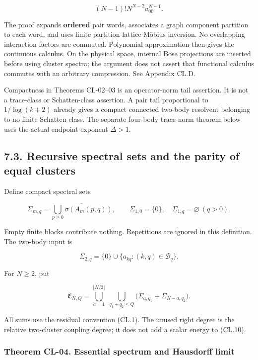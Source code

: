 \documentclass[a4paper,11pt]{article}
\numberwithin{equation}{section}
\begin{document}
\[
(N-1)!N^{N-2}a_{00}^{N-1}.
\tag{CL.8}
\]

The proof expands \textbf{ordered} pair words, associates a graph component partition to each word, and uses finite partition-lattice Möbius inversion. No overlapping interaction factors are commuted. Polynomial approximation then gives the continuous calculus. On the physical space, internal Bose projections are inserted before using cluster spectra; the argument does not assert that functional calculus commutes with an arbitrary compression. See Appendix CL.D.

Compactness in Theorems CL-02--03 is an operator-norm tail assertion. It is not a trace-class or Schatten-class assertion. A pair tail proportional to \(1/\log(k+2)\) already gives a compact connected two-body resolvent belonging to no finite Schatten class. The separate four-body trace-norm theorem below uses the actual endpoint exponent \(\Delta>1\).

\hypertarget{recursive-spectral-sets-and-the-parity-of-equal-clusters}{%
\subsection{7.3. Recursive spectral sets and the parity of equal clusters}\label{recursive-spectral-sets-and-the-parity-of-equal-clusters}}

Define compact spectral sets

\[
\Sigma_{m,q}=\overline{\bigcup_{p\geq0}\sigma(A_m(p,q))},
\qquad \Sigma_{1,0}=\{0\},\quad \Sigma_{1,q}=\varnothing\ (q>0).
\tag{CL.9}
\]

Empty finite blocks contribute nothing. Repetitions are ignored in this definition. The two-body input is

\[
\Sigma_{2,q}=\{0\}\cup\{a_{kq}:(k,q)\in\mathcal B_q\}.
\]

For \(N\geq2\), put

\[
\mathfrak C_{N,Q}=
\bigcup_{a=1}^{\lfloor N/2\rfloor}
\ \bigcup_{q_1+q_2\leq Q}
\bigl(\Sigma_{a,q_1}+\Sigma_{N-a,q_2}\bigr).
\tag{CL.10}
\]

All sums use the residual convention (CL.1). The unused right degree is the relative two-cluster coupling degree; it does not add a scalar energy to (CL.10).

\hypertarget{theorem-cl-04.-essential-spectrum-and-hausdorff-limit}{%
\subsubsection{Theorem CL-04. Essential spectrum and Hausdorff limit}\label{theorem-cl-04.-essential-spectrum-and-hausdorff-limit}}
\end{document}
